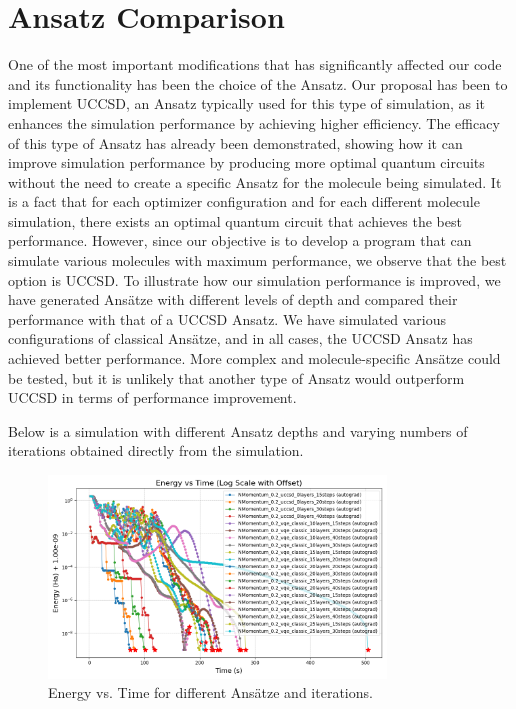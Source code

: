 \section{Ansatz Comparison}
One of the most important modifications that has significantly affected our code and its functionality has been the choice of the Ansatz. Our proposal has been to implement UCCSD, an Ansatz typically used for this type of simulation, as it enhances the simulation performance by achieving higher efficiency. The efficacy of this type of Ansatz has already been demonstrated, showing how it can improve simulation performance by producing more optimal quantum circuits without the need to create a specific Ansatz for the molecule being simulated. It is a fact that for each optimizer configuration and for each different molecule simulation, there exists an optimal quantum circuit that achieves the best performance. However, since our objective is to develop a program that can simulate various molecules with maximum performance, we observe that the best option is UCCSD. To illustrate how our simulation performance is improved, we have generated Ansätze with different levels of depth and compared their performance with that of a UCCSD Ansatz. We have simulated various configurations of classical Ansätze, and in all cases, the UCCSD Ansatz has achieved better performance. More complex and molecule-specific Ansätze could be tested, but it is unlikely that another type of Ansatz would outperform UCCSD in terms of performance improvement.

Below is a simulation with different Ansatz depths and varying numbers of iterations obtained directly from the simulation.

\begin{figure}[H]
  \centering
  \includegraphics[width=0.8\textwidth]{data/Anzatz/results_ansatz_lyers_dif_iterations/energy_vs_time_log_offset.png}
  \caption{Energy vs. Time for different Ansätze and iterations.}
  \label{fig:ansatz_layers_iterations}
\end{figure}

